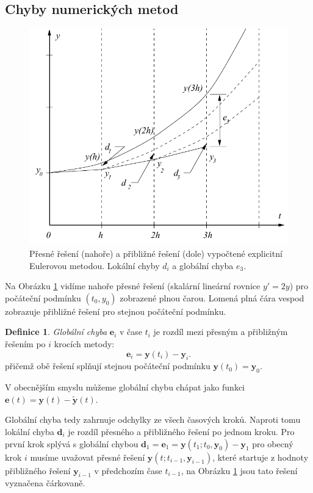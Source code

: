 \documentclass[a4paper, 12pt]{book}
\theoremstyle{definition}
\newtheorem{definition}[theorem]{Definice}
\def\vc#1{\mathbf{\boldsymbol{#1}}}     %
\def\df#1{\emph{#1}}
\begin{document}
\subsection{Chyby numerických metod}
\begin{figure}[h]
 \centering
 \includegraphics[bb=0 0 355 297]{Flaherty_2_1_1.pdf}
 \caption{Přesné řešení (nahoře) a přibližné řešení (dole) vypočtené explicitní Eulerovou metodou. Lokální chyby $d_i$ a globální chyba $e_3$.}
 \label{fig:Euler_approx}
\end{figure}

Na Obrázku \ref{fig:Euler_approx} vidíme nahoře přesné řešení (skalární lineární rovnice $y'=2y$) pro počáteční podmínku $(t_0, y_0)$ zobrazené plnou čarou.
Lomená plná čára vespod zobrazuje přibližné řešení pro stejnou počáteční podmínku. 

\begin{definition}
 \df{Globální chyba} $\vc e_i$ v čase $t_i$ je rozdíl mezi přesným a přibližným řešením po $i$ krocích metody:
 \[
    \vc e_i = \vc y(t_i) - \vc y_i.
 \]
 přičemž obě řešení splňují stejnou počáteční podmínku $\vc y(t_0)=\vc y_0$.
\end{definition}
V obecnějším smyslu můžeme globální chybu chápat jako funkci $\vc e(t) = \vc y(t) - \vc{\tilde y}(t)$.

Globální chyba tedy zahrnuje odchylky ze všech časových kroků.
Naproti tomu lokální chyba $\vc d_i$ je rozdíl přesného a přibližného řešení po jednom kroku. Pro první krok splývá s globální chybou 
$\vc d_1=\vc e_1=\vc y(t_1; t_0, \vc y_0) - \vc y_1$ pro obecný krok $i$ musíme uvažovat přesné řešení $\vc y(t; t_{i-1}, \vc y_{i-1})$,
které startuje 
z hodnoty přibližného řešení $\vc y_{i-1}$ v předchozím čase $t_{i-1}$, na Obrázku \ref{fig:Euler_approx} jsou tato řešení vyznačena čárkovaně.
\end{document}
